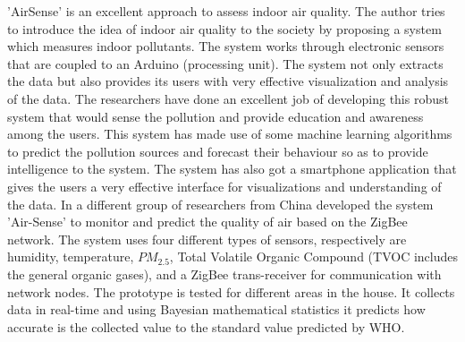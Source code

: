 'AirSense'\cite{Fang2016} is an excellent approach to assess indoor air quality. The author tries to introduce the idea of indoor air quality to the society by proposing a system which measures indoor pollutants. The system works through electronic sensors that are coupled to an Arduino (processing unit). The system not only extracts the data but also provides its users with very effective visualization and analysis of the data. The researchers have done an excellent job of developing this robust system that would sense the pollution and provide education and awareness among the users. This system has made use of some machine learning algorithms to predict the pollution sources and forecast their behaviour so as to provide intelligence to the system. 
The system has also got a smartphone application that gives the users a very effective interface for visualizations and understanding of the data. In \cite{Liu2017} a different group of researchers from China developed the system 'Air-Sense' to monitor and predict the quality of air based on the ZigBee network. The system uses four different types of sensors, respectively are humidity, temperature, $PM_{2.5}$, Total Volatile Organic Compound (TVOC includes the general organic gases), and a ZigBee trans-receiver for communication with network nodes. The prototype is tested for different areas in the house. It collects data in real-time and using Bayesian mathematical statistics it predicts how accurate is the collected value to the standard value predicted by WHO. 
\par

